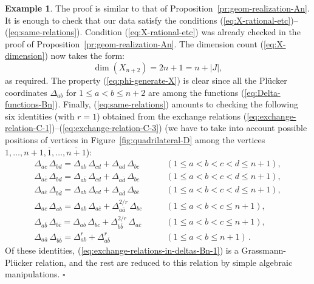 \documentclass[letterpaper]{amsart}
\numberwithin{equation}{section}
\theoremstyle{definition}
\newtheorem{example}[theorem]{Example}
\def\proof{\smallskip\noindent {\bf Proof.\ }}
\def\endproof{\hfill$\square$\medskip}
\begin{document}
\begin{example}
\proof 
The proof is similar to that of 
Proposition~\ref{pr:geom-realization-An}. 
It is enough to check that our data satisfy the conditions 
(\ref{eq:X-rational-etc})--(\ref{eq:same-relations}). 
Condition (\ref{eq:X-rational-etc}) was already checked in 
the proof  of Proposition~\ref{pr:geom-realization-An}. 
The dimension count (\ref{eq:X-dimension}) now takes the form: 
$$\dim (X_{n+2}) = 2n+1 = n + |J|,$$ 
as required. 
The property (\ref{eq:phi-generate-X}) is clear since 
all the Pl\"ucker coordinates $\Delta_{ab}$ for $1 \leq a < b \leq n+2$ 
are among the functions (\ref{eq:Delta-functions-Bn}). 
Finally, (\ref{eq:same-relations}) amounts to checking the 
following six identities (with $r=1$) obtained from the exchange relations 
(\ref{eq:exchange-relation-C-1})--(\ref{eq:exchange-relation-C-3}) 
(we have to take into account possible positions of vertices 
in Figure~\ref{fig:quadrilateral-D} among the vertices 
$1, \dots, n+1, \overline 1, \dots, \overline {n+1}$): 
\begin{align} 
\label{eq:exchange-relations-in-deltas-Bn-1} 
\Delta_{ac} \, \Delta_{bd} = 
\Delta_{ab}\, \Delta_{cd} + 
\Delta_{ad}\, \Delta_{bc}  \qquad & (1 \leq a < b < c < d \leq n+1),\\ 
\label{eq:exchange-relations-in-deltas-Bn-2} 
\Delta_{a \overline c} \, \Delta_{bd} = 
\Delta_{a \overline b}\, \Delta_{cd} + 
\Delta_{a \overline d}\, \Delta_{bc} \qquad & (1 \leq a < b < c < d \leq n+1),\\ 
\label{eq:exchange-relations-in-deltas-Bn-3} 
\Delta_{a \overline c} \, \Delta_{b \overline d} = 
\Delta_{ab}\, \Delta_{cd} + 
\Delta_{a \overline d}\, \Delta_{b \overline c} \qquad & (1 \leq a < b 
< c < d \leq n+1),\\ 
\label{eq:exchange-relations-in-deltas-Bn-4} 
\Delta_{ac} \, \Delta_{a \overline b} = 
\Delta_{ab}\, \Delta_{a \overline c} + 
\Delta_{a \overline a}^{2/r} \, \Delta_{bc} \qquad & (1 \leq a < b < c \leq n+1),\\ 
\label{eq:exchange-relations-in-deltas-Bn-5} 
\Delta_{a \overline b} \, \Delta_{b \overline c} = 
\Delta_{ab}\, \Delta_{bc} + 
\Delta_{b \overline b}^{2/r} \, \Delta_{a \overline c} \qquad & 
(1 \leq a < b < c \leq n+1),\\ 
\label{eq:exchange-relations-in-deltas-Bn-6} 
\Delta_{a\overline a}\, \Delta_{b \overline b} = 
\Delta_{ab}^r + \Delta_{a \overline b}^r \qquad\qquad &(1 \leq a < b \leq n+1) \, . 
\end{align} 
Of these identities, (\ref{eq:exchange-relations-in-deltas-Bn-1}) is 
a Grassmann-Pl\"ucker relation, and the rest are reduced 
to this relation by simple algebraic manipulations. 
\endproof 
 
\end{example} 
 
\end{document}
